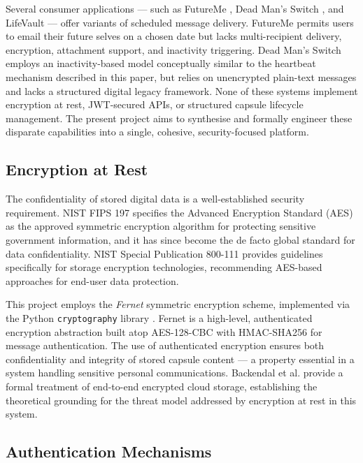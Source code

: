 \documentclass[12pt, a4paper]{article}
\begin{document}
Several consumer applications — such as FutureMe \cite{futureme}, Dead Man's Switch \cite{deadmansswitch}, and LifeVault — offer variants of scheduled message delivery. FutureMe permits users to email their future selves on a chosen date but lacks multi-recipient delivery, encryption, attachment support, and inactivity triggering. Dead Man's Switch employs an inactivity-based model conceptually similar to the heartbeat mechanism described in this paper, but relies on unencrypted plain-text messages and lacks a structured digital legacy framework. None of these systems implement encryption at rest, JWT-secured APIs, or structured capsule lifecycle management. The present project aims to synthesise and formally engineer these disparate capabilities into a single, cohesive, security-focused platform.

\subsection{Encryption at Rest}

The confidentiality of stored digital data is a well-established security requirement. NIST FIPS 197 \cite{nist2001} specifies the Advanced Encryption Standard (AES) as the approved symmetric encryption algorithm for protecting sensitive government information, and it has since become the de facto global standard for data confidentiality. NIST Special Publication 800-111 \cite{nist2007} provides guidelines specifically for storage encryption technologies, recommending AES-based approaches for end-user data protection.

This project employs the \textit{Fernet} symmetric encryption scheme, implemented via the Python \texttt{cryptography} library \cite{pyca2024}. Fernet is a high-level, authenticated encryption abstraction built atop AES-128-CBC with HMAC-SHA256 for message authentication. The use of authenticated encryption ensures both confidentiality and integrity of stored capsule content — a property essential in a system handling sensitive personal communications. Backendal et al. \cite{backendal2024ieee, backendal2024crypto} provide a formal treatment of end-to-end encrypted cloud storage, establishing the theoretical grounding for the threat model addressed by encryption at rest in this system.

\subsection{Authentication Mechanisms}
\end{document}

